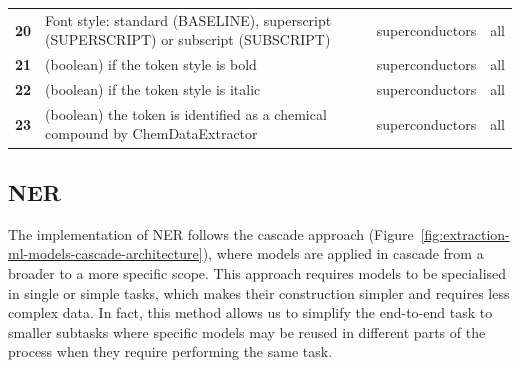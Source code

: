 \begin{table}
\begin{tabular}{l m{30em} c c}
        \textbf{20}   & Font style: standard (BASELINE), superscript (SUPERSCRIPT) or subscript (SUBSCRIPT)   & superconductors & all                   \\
        \textbf{21}   & (boolean) if the token style is bold & superconductors & all                   \\
        \textbf{22}   & (boolean) if the token style is italic & superconductors & all                   \\
        \textbf{23}   & (boolean) the token is identified as a chemical compound by ChemDataExtractor\cite{chemdataextractor}                                                                                                                                                    & superconductors & all                   \\
        \bottomrule
    \end{tabular}
    \label{tab:ML-model-features}
\end{table}

\subsection{NER}
\label{subsec:ner-solution}

The implementation of NER follows the cascade approach (Figure~\ref{fig:extraction-ml-models-cascade-architecture}), where models are applied in cascade from a broader to a more specific scope. This approach requires models to be specialised in single or simple tasks, which makes their construction simpler and requires less complex data. 
In fact, this method allows us to simplify the end-to-end task to smaller subtasks where specific models may be reused in different parts of the process when they require performing the same task. 

